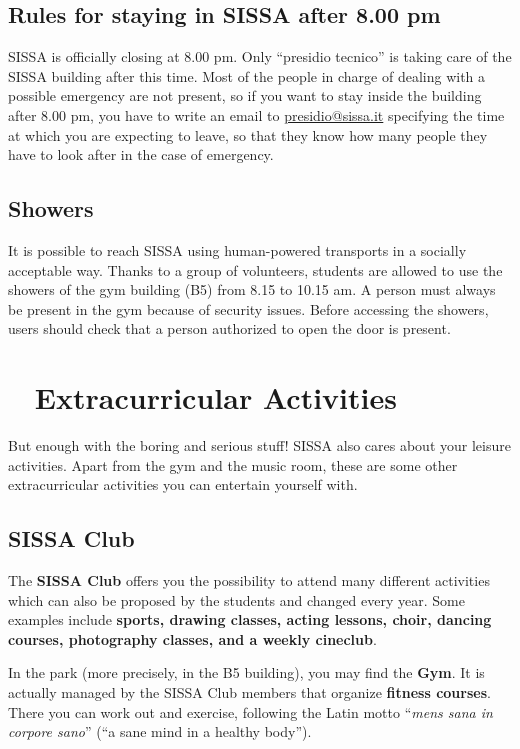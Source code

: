 \documentclass{sissavademecum}
\begin{document}
\section{Rules for staying in SISSA after 8.00 pm}

SISSA is officially closing at 8.00 pm. Only ``presidio tecnico'' is taking care of the SISSA building after this time. Most of the people in charge of dealing with a possible emergency are not present, so if you want to stay inside the building after 8.00 pm, you have to write an email to \href{mailto:presidio@sissa.it}{presidio@sissa.it} specifying the time at which you are expecting to leave, so that they know how many people they have to look after in the case of emergency.


\section{Showers}

It is possible to reach SISSA using human-powered transports in a socially acceptable way. Thanks to a group of volunteers, students are allowed to use the showers of the gym building (B5) from 8.15 to 10.15 am. A person must always be present in the gym because of security issues. Before accessing the showers, users should check that a person authorized to open the door is present.




\chapter{\texorpdfstring{\faFutbol\ }{} Extracurricular Activities}

But enough with the boring and serious stuff! SISSA also cares about your leisure activities. Apart from the gym and the music room, these are some other extracurricular activities you can entertain yourself with.


\section{SISSA Club}

The \textbf{SISSA Club} offers you the possibility to attend many different activities which can also be proposed by the students and changed every year. Some examples include \textbf{sports, drawing classes, acting lessons, choir, dancing courses, photography classes, and a weekly cineclub}. 

In the park (more precisely, in the B5 building), you may find the \textbf{Gym}. It is actually managed by the SISSA Club members that organize \textbf{fitness courses}. There you can work out and exercise, following the Latin motto ``\textit{mens sana in corpore sano}{}'' (``a sane mind in a healthy body''). 
\end{document}
